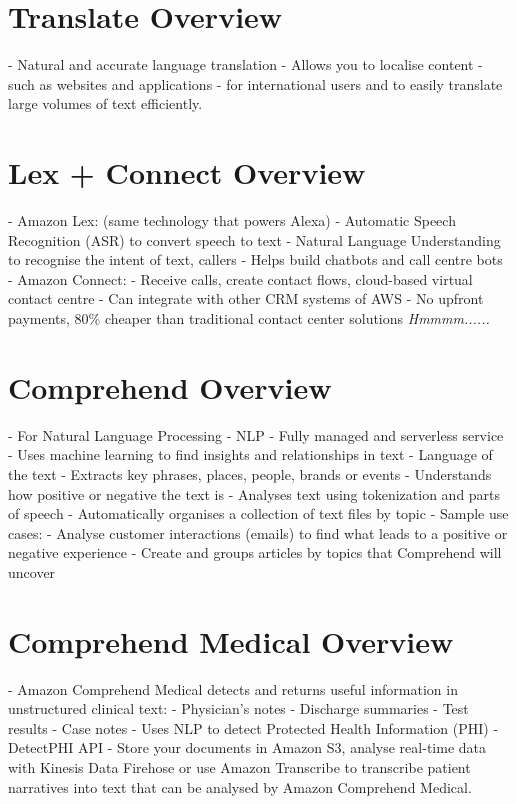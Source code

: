\documentclass[11pt]{book}
\begin{document}
    \section{Translate Overview}
    - Natural and accurate language translation
    - Allows you to localise content - such as websites and applications - for international users and to easily translate large volumes of text efficiently.


    \section{Lex + Connect Overview}
    - Amazon Lex: (same technology that powers Alexa)
    - Automatic Speech Recognition (ASR) to convert speech to text
    - Natural Language Understanding to recognise the intent of text, callers
    - Helps build chatbots and call centre bots
    - Amazon Connect:
    - Receive calls, create contact flows, cloud-based virtual contact centre
    - Can integrate with other CRM systems of AWS
    - No upfront payments, 80\% cheaper than traditional contact center solutions \textit{Hmmmm......}


    \section{Comprehend Overview}
    - For Natural Language Processing - NLP
    - Fully managed and serverless service
    - Uses machine learning to find insights and relationships in text
    - Language of the text
    - Extracts key phrases, places, people, brands or events
    - Understands how positive or negative the text is
    - Analyses text using tokenization and parts of speech
    - Automatically organises a collection of text files by topic
    - Sample use cases:
    - Analyse customer interactions (emails) to find what leads to a positive or negative experience
    - Create and groups articles by topics that Comprehend will uncover


    \section{Comprehend Medical Overview}
    - Amazon Comprehend Medical detects and returns useful information in unstructured clinical text:
    - Physician's notes
    - Discharge summaries
    - Test results
    - Case notes
    - Uses NLP to detect Protected Health Information (PHI) - DetectPHI API
    - Store your documents in Amazon S3, analyse real-time data with Kinesis Data Firehose or use Amazon Transcribe to transcribe patient narratives into text that can be analysed by Amazon Comprehend Medical.
\end{document}
